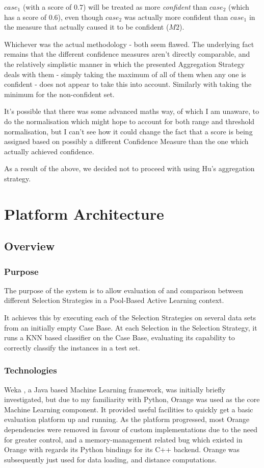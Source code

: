 \documentclass[a4paper,11pt]{report}
\begin{document}
\begin{enumerate}
	$case_{1}$ (with a score of $0.7$) will be treated as more \emph{confident} than $case_{2}$ (which has a score of $0.6$), even though $case_{2}$ was actually more confident than $case_{1}$ in the measure that actually caused it to be confident ($M2$).
	
\end{enumerate}

Whichever was the actual methodology - both seem flawed. The underlying fact remains that the different confidence measures aren't directly comparable, and the relatively simplistic manner in which the presented Aggregation Strategy deals with them - simply taking the maximum of all of them when any one is confident - does not appear to take this into account. Similarly with taking the minimum for the non-confident set.

It's possible that there was some advanced maths way, of which I am unaware, to do the normalisation which might hope to account for both range and threshold normalisation, but I can't see how it could change the fact that a score is being assigned based on possibly a different Confidence Measure than the one which actually achieved confidence.

As a result of the above, we decided not to proceed with using Hu's aggregation strategy.

\chapter{Platform Architecture\label{cha:platarch}}
\section{Overview}
\subsection{Purpose}
The purpose of the system is to allow evaluation of and comparison between different Selection Strategies in a Pool-Based Active Learning context.

It achieves this by executing each of the Selection Strategies on several data sets from an initially empty Case Base. At each Selection in the Selection Strategy, it runs a KNN based classifier on the Case Base, evaluating its capability to correctly classify the instances in a test set.

\subsection{Technologies}
Weka \citep{prog:weka}, a Java based Machine Learning framework, was initially briefly investigated, but due to my familiarity with Python, Orange \citep{prog:orange} was used as the core Machine Learning component. It provided useful facilities to quickly get a basic evaluation platform up and running. As the platform progressed, most Orange dependencies were removed in favour of custom implementations due to the need for greater control, and a memory-management related bug which existed in Orange with regards its Python bindings for its C++ backend. Orange was subsequently just used for data loading, and distance computations.
\end{document}
